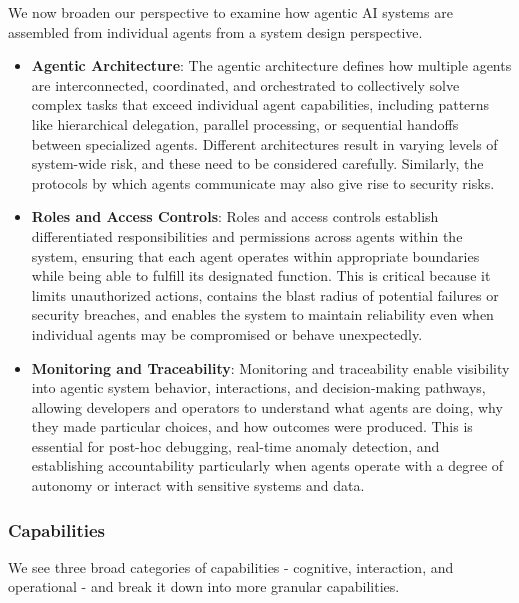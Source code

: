 \documentclass{article}
\begin{document}
We now broaden our perspective to examine how agentic AI systems are assembled from individual agents from a system design perspective.

\begin{itemize}

    \item \textbf{Agentic Architecture}: The agentic architecture defines how multiple agents are interconnected, coordinated, and orchestrated to collectively solve complex tasks that exceed individual agent capabilities, including patterns like hierarchical delegation, parallel processing, or sequential handoffs between specialized agents. Different architectures result in varying levels of system-wide risk, and these need to be considered carefully. Similarly, the protocols \citep{a2a} by which agents communicate may also give rise to security risks. 

    \item \textbf{Roles and Access Controls}: Roles and access controls establish differentiated responsibilities and permissions across agents within the system, ensuring that each agent operates within appropriate boundaries while being able to fulfill its designated function. This is critical because it limits unauthorized actions, contains the blast radius of potential failures or security breaches, and enables the system to maintain reliability even when individual agents may be compromised or behave unexpectedly.

    \item \textbf{Monitoring and Traceability}: Monitoring and traceability enable visibility into agentic system behavior, interactions, and decision-making pathways, allowing developers and operators to understand what agents are doing, why they made particular choices, and how outcomes were produced. This is essential for post-hoc debugging, real-time anomaly detection, and establishing accountability particularly when agents operate with a degree of autonomy or interact with sensitive systems and data.

\end{itemize}

\subsubsection{Capabilities}
\label{sec:capabilities}

We see three broad categories of capabilities - cognitive, interaction, and operational - and break it down into more granular capabilities.
\end{document}
